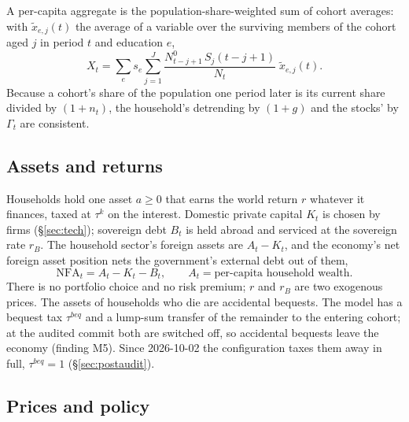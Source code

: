 \documentclass[11pt,a4paper]{article}
\begin{document}
A per-capita aggregate is the population-share-weighted sum of cohort averages: with $\tilde{x}_{e,j}(t)$ the average of a variable over the surviving members of the cohort aged $j$ in period $t$ and education $e$,
\[
X_t = \sum_e s_e \sum_{j=1}^{J} \frac{N^0_{t-j+1}\, S_j(t-j+1)}{N_t}\; \tilde{x}_{e,j}(t).
\]
Because a cohort's share of the population one period later is its current share divided by $(1+n_t)$, the household's detrending by $(1+g)$ and the stocks' by $\Gamma_t$ are consistent.

\subsection{Assets and returns}

Households hold one asset $a \ge 0$ that earns the world return $r$ whatever it finances, taxed at $\tau^k$ on the interest. Domestic private capital $K_t$ is chosen by firms (\S\ref{sec:tech}); sovereign debt $B_t$ is held abroad and serviced at the sovereign rate $r_B$. The household sector's foreign assets are $A_t - K_t$, and the economy's net foreign asset position nets the government's external debt out of them,
\[
\mathrm{NFA}_t = A_t - K_t - B_t, \qquad A_t = \text{per-capita household wealth.}
\]
There is no portfolio choice and no risk premium; $r$ and $r_B$ are two exogenous prices. The assets of households who die are accidental bequests. The model has a bequest tax $\tau^{beq}$ and a lump-sum transfer of the remainder to the entering cohort; at the audited commit both are switched off, so accidental bequests leave the economy (finding M5). Since 2026-10-02 the configuration taxes them away in full, $\tau^{beq} = 1$ (\S\ref{sec:postaudit}).

\subsection{Prices and policy}
\end{document}
